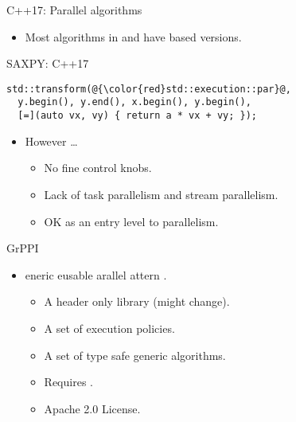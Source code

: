 \begin{frame}[t,fragile]{C++17: Parallel algorithms}
\begin{itemize}
  \item Most algorithms in  and 
        have  based versions.
\end{itemize}

\pause
\begin{block}{SAXPY: C++17}
\begin{lstlisting}[escapechar=@]
std::transform(@{\color{red}std::execution::par}@,
  y.begin(), y.end(), x.begin(), y.begin(),
  [=](auto vx, vy) { return a * vx + vy; });
\end{lstlisting}
\end{block}

\pause
\begin{itemize}
  \item However \ldots
    \begin{itemize}
      \item No fine control knobs.
      \item Lack of task parallelism and stream parallelism.
      \item OK as an entry level to parallelism.
    \end{itemize}
\end{itemize}
\end{frame}

\begin{frame}[t]{GrPPI}
\begin{Large}
\end{Large}
\vfill\pause
\begin{itemize}
  \item {}eneric eusable arallel
        attern .
    \begin{itemize}
      \item A header only library (might change).
      \item A set of execution policies.
      \item A set of type safe generic algorithms.
      \item Requires .
      \item Apache 2.0 License.
    \end{itemize}
\end{itemize}
\end{frame}

